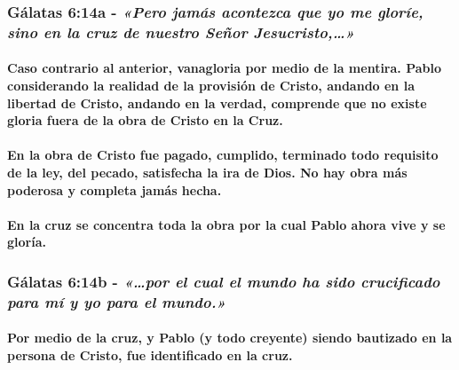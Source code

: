 \documentclass[11a pt,twoside]{article}
\newcommand{\scripture}[1]{%
  {\fontsize{12pt}{16pt}\selectfont\ScriptureFont\itshape #1}%
}
\let\oldsubsubsection\subsubsection
\renewcommand{\subsubsection}{\needspace{4\baselineskip}\oldsubsubsection}
\let\oldparagraph\paragraph
\renewcommand{\paragraph}{\needspace{3\baselineskip}\oldparagraph}
\begin{document}
\subsubsection{\texorpdfstring{Gálatas 6:14a -
\scripture{«Pero jamás acontezca que yo me gloríe, sino en la cruz de nuestro Señor Jesucristo,…»}}{Gálatas 6:14a - }}\label{guxe1latas-614a---pero-jamuxe1s-acontezca-que-yo-me-gloruxede-sino-en-la-cruz-de-nuestro-seuxf1or-jesucristo}

\paragraph{Caso contrario al anterior, vanagloria por medio de la
mentira. Pablo considerando la realidad de la provisión de Cristo,
andando en la libertad de Cristo, andando en la verdad, comprende que no
existe gloria fuera de la obra de Cristo en la
Cruz.}\label{caso-contrario-al-anterior-vanagloria-por-medio-de-la-mentira.-pablo-considerando-la-realidad-de-la-provisiuxf3n-de-cristo-andando-en-la-libertad-de-cristo-andando-en-la-verdad-comprende-que-no-existe-gloria-fuera-de-la-obra-de-cristo-en-la-cruz.}

\paragraph{En la obra de Cristo fue pagado, cumplido, terminado todo
requisito de la ley, del pecado, satisfecha la ira de Dios. No hay obra
más poderosa y completa jamás
hecha.}\label{en-la-obra-de-cristo-fue-pagado-cumplido-terminado-todo-requisito-de-la-ley-del-pecado-satisfecha-la-ira-de-dios.-no-hay-obra-muxe1s-poderosa-y-completa-jamuxe1s-hecha.}

\paragraph{En la cruz se concentra toda la obra por la cual Pablo ahora
vive y se
gloría.}\label{en-la-cruz-se-concentra-toda-la-obra-por-la-cual-pablo-ahora-vive-y-se-gloruxeda.}

\subsubsection{\texorpdfstring{Gálatas 6:14b -
\scripture{«…por el cual el mundo ha sido crucificado para mí y yo para el mundo.»}}{Gálatas 6:14b - }}\label{guxe1latas-614b---por-el-cual-el-mundo-ha-sido-crucificado-para-muxed-y-yo-para-el-mundo.}

\paragraph{Por medio de la cruz, y Pablo (y todo creyente) siendo
bautizado en la persona de Cristo, fue identificado en la
cruz.}\label{por-medio-de-la-cruz-y-pablo-y-todo-creyente-siendo-bautizado-en-la-persona-de-cristo-fue-identificado-en-la-cruz.}
\end{document}

